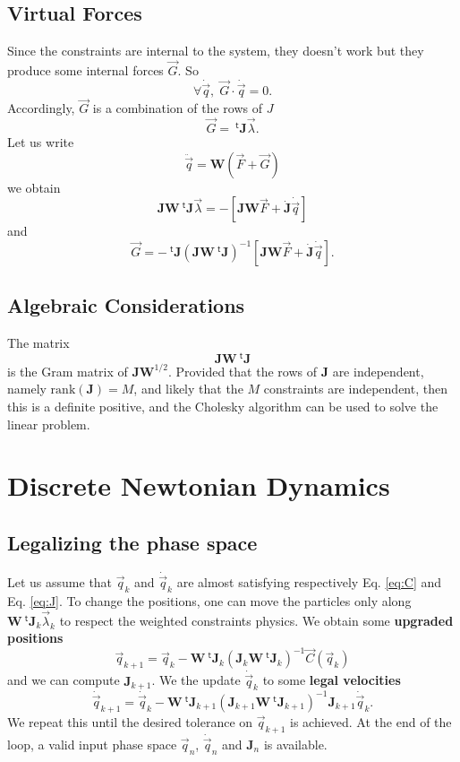 \documentclass[aps,twocolumn]{revtex4}
\newcommand{\mymat}[1]{\boldsymbol{#1}}
\newcommand{\mytrn}[1]{{\!\!~^{\mathsf{t}}{#1}}}
\newcommand{\q}{\vec{q}}
\newcommand{\dq}{\dot{\q}}
\newcommand{\ddq}{\ddot{\q}}
\newcommand{\C}{\vec{C}}
\newcommand{\J}{\mymat{J}}
\newcommand{\dJ}{\dot{\J}}
\newcommand{\tJ}{\mytrn{\J}}
\newcommand{\G}{\vec{G}}
\newcommand{\W}{\mymat{W}}
\begin{document}
\subsection{Virtual Forces}
Since the constraints are internal to the system, they doesn't work but they produce some internal
forces $\G$. So
\begin{equation}
\forall \dq, \; \G\cdot\dq = 0.
\end{equation}
Accordingly, $\G$ is a combination of the rows of $J$
\begin{equation}
	\G = \tJ \vec{\lambda}.
\end{equation}
Let us write
\begin{equation}
	\ddq = \W \left( \vec{F} + \G \right)
\end{equation}
we obtain
\begin{equation}
	\J \W \tJ \vec{\lambda} = -\left\lbrack \J\W\vec{F} + \dJ \dq \right\rbrack
\end{equation}
and
\begin{equation}
	\G = - \tJ \left(\J \W \tJ \right)^{-1}\left\lbrack \J\W\vec{F} + \dJ \dq \right\rbrack.
\end{equation}

\subsection{Algebraic Considerations}
The matrix
\begin{equation}
	 \J \W \tJ 
\end{equation}
is the Gram matrix of $\J\W^{1/2}$.
Provided that the rows of $\J$ are independent, namely $\text{rank}(\J)=M$, and likely that the $M$ constraints are independent, 
then this is a definite positive, and the Cholesky algorithm can be used to solve the linear problem.

\section{Discrete Newtonian Dynamics}

\subsection{Legalizing the phase space}
Let us assume that $\q_k$ and $\dq_{k}$ are almost satisfying respectively Eq. \eqref{eq:C} and Eq. \eqref{eq:J}.
To change the positions, one can move the particles only along $\W\tJ_k \vec{\lambda}_k$ to respect the weighted constraints physics.
We obtain some \textbf{upgraded positions}
\begin{equation}
	\label{eq:legal_q}
	\q_{k+1} = \q_k - \W \tJ_k \left(\J_k \W \tJ_k \right)^{-1} \C(\q_k)
\end{equation}
and we can compute $\J_{k+1}$.
We the update $\dq_k$ to some \textbf{legal velocities}
\begin{equation}
	\label{eq:legal_dq}
	\dq_{k+1} = \dq_k - \W\tJ_{k+1} \left(\J_{k+1} \W \tJ_{k+1} \right)^{-1} \J_{k+1} \dq_k.
\end{equation}
We repeat this until the desired tolerance on $\q_{k+1}$ is achieved.
At the end of the loop, a valid input phase space $\q_{n}$, $\dq_{n}$ and $\J_n$ is available.
\end{document}
